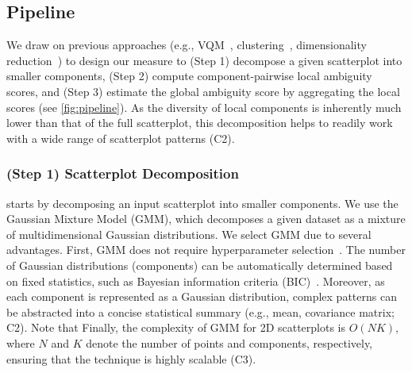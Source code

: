 \subsection{\measure Pipeline}

\label{sec:pipeline}



We draw on previous approaches (e.g., VQM~\cite{abbas19cgf}, clustering~\cite{halkidi01icdm, rousseeuw87jcam}, dimensionality reduction~\cite{venna06nn, lee2007springer}) to design our measure to (Step 1) decompose a given scatterplot into smaller components, (Step 2) compute component-pairwise local ambiguity scores, and (Step 3) estimate the global ambiguity score by aggregating the local scores (see \autoref{fig:pipeline}). As the diversity of local components is 
inherently much lower than 
that of the full scatterplot, this decomposition
helps \measure to readily work with a wide range of scatterplot patterns (C2). 

\subsubsection*{(Step 1) Scatterplot Decomposition}

\measure starts by decomposing an input scatterplot into smaller components. 
We use the Gaussian Mixture Model (GMM), which decomposes a given dataset as a mixture of multidimensional Gaussian distributions. 
We select GMM due to several advantages. 
First, GMM does not require hyperparameter selection~\cite{abbas19cgf}. The number of Gaussian distributions (components) can be automatically determined based on fixed statistics, such as Bayesian information criteria (BIC)~\cite{schwarz78ans}. Moreover, as each component is represented as a Gaussian distribution, complex patterns can be abstracted into a concise statistical summary (e.g., mean, covariance matrix; C2).
Note that 
Finally, the complexity of GMM for 2D scatterplots is $O(NK)$, where $N$ and $K$ denote the number of points and components, respectively, ensuring that the technique is highly scalable (C3).
 

